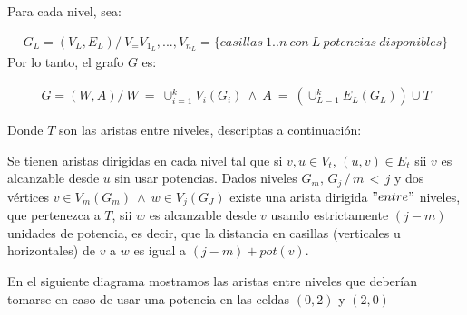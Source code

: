 \vspace{2mm}

Para cada nivel, sea:

\begin{align*}
G_L = (V_L, E_L) /\: V_ = {V_{1_{L}},..., V_{n_{L}}} =  \{ casillas \: 1..n  \:con \: L \: potencias \: disponibles \}
\end{align*}
\vspace{2mm}
Por lo tanto, el grafo $G$ es:

\begin{align*}
G = (W, A) /\: W \: =  \:\cup_{i=1}^{k} V_i(G_i) \: \land \: A \: = \: (\cup_{L=1}^{k} E_L(G_L)) \cup T
\end{align*}

\vspace{2mm}

Donde $T$ son las aristas entre niveles, descriptas a continuaci\'on:

\vspace{2mm}

Se tienen aristas dirigidas en cada nivel tal que si $v, u \in V_t$, $(u,v) \in E_t$ sii $v$ es alcanzable desde $u$ sin usar potencias.
Dados niveles $G_m,\, G_j\, /\, m\,< \,j$ y dos v\'ertices $v \in V_m(G_m) \: \land \: w \in V_j(G_J)$ existe una arista dirigida $"entre"$ niveles, que pertenezca a $T$, sii $w$ es alcanzable desde $v$ usando estrictamente $(j-m)$ unidades de potencia, es decir, que la distancia en casillas (verticales u horizontales) de $v$ a $w$ es igual a $(j-m) + pot(v)$.

\vspace{2mm}

En el siguiente diagrama mostramos las aristas entre niveles que deber\'ian tomarse en caso de usar una potencia en las celdas $(0,2)$ y $(2,0)$

